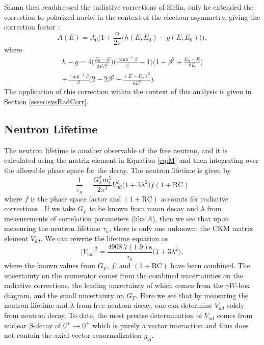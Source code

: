 Shann then readdressed the radiative corrections of Sirlin, only he extended the
correction to polarized nuclei in the context of the electron asymmetry,
giving the correction factor \cite{shann1971}:
%
\begin{equation}
  A(E) = A_0\bigg(1+\frac{\alpha}{2\pi}\Big(h(E,E_0)-g(E,E_0)\Big)\bigg),
\end{equation}
where
\begin{multline}
  h-g = 4 \bigg( \frac{E_0-E}{3E\beta^2} \bigg)
  \bigg( \frac{\tanh^{-1}\beta}{\beta}-1 \bigg)
  \bigg(1-\beta^2+ \frac{E_0-E}{8E} \bigg) \\
  + \frac{\tanh^{-1}\beta}{\beta}
  \bigg( 2-2\beta^2-\frac{\left(E-E_0\right)^2}{6E^2} \bigg).
\end{multline}
%
The application of this correction within the context of this analysis is given in
Section \ref{sssec:sysRadCorr}.

\subsection{Neutron Lifetime}
The neutron lifetime is another observable of the free neutron, and it is calculated using the matrix
element in Equation \ref{eq:M} and then integrating over the allowable phase space for the decay.
The neutron lifetime is given by
%
\begin{equation}
  \frac{1}{\tau_n} = \frac{G_F^2 m_e^5}{2\pi^3}V_{ud}^2 \big(1+3\lambda^2)f(1+\mathrm{RC})
\end{equation}
%
where $f$ is the phase space factor and $(1+\mathrm{RC})$ accounts for radiative
corrections \cite{czarnecki2004precision,marciano2006}. If we take $G_F$ to be known from muon decay and $\lambda$ from
measurements of correlation parameters (like $A$), then we see that upon measuring the
neutron lifetime $\tau_n$, there is only one unknown: the CKM matrix element $V_{ud}$.
We can rewrite the lifetime equation as
%
\begin{equation}
  |V_{ud}|^2 = \frac{4908.7(1.9)\mathrm{s}}{\tau_n}\big(1+3\lambda^2\big),
\end{equation}
where the known values from $G_F$, $f$, and $(1+\mathrm{RC})$ have been combined.
The uncertainty on the numerator comes from the combined uncertainties on
the radiative corrections, the leading uncertainty of which comes from
the $\gamma W$-box diagram, and the small uncertainty on $G_F$. Here we see that
by measuring the neutron lifetime and $\lambda$ from free neutron decay,
one can determine $V_{ud}$ solely from neutron decay. 
To date, the most precise determination of $V_{ud}$ comes from nuclear
$\beta$-decay of $0^+ \rightarrow 0^+$ which is purely a vector interaction
and thus does not contain the axial-vector renormalization $g_A$.



